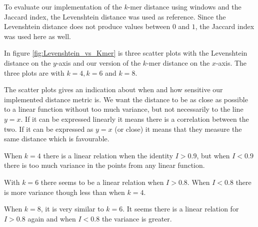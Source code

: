 To evaluate our implementation of the $k$-mer distance using windows and the
Jaccard index, the Levenshtein distance was used as reference. Since the
Levenshtein distance does not produce values between $0$ and $1$, the Jaccard
index was used here as well.

In figure \ref{fig:Levenshtein_vs_Kmer} is three scatter plots with the
Levenshtein distance on the $y$-axis and our version of the $k$-mer distance on
the $x$-axis. The three plots are with $k=4, k=6$ and $k=8$.

The scatter plots gives an indication about when and how sensitive our
implemented distance metric is. We want the distance to be as close as possible
to a linear function without too much variance, but not necessarily to the line
$y=x$. If it can be expressed linearly it means there is a correlation between
the two. If it can be expressed as $y=x$ (or close) it means that they measure
the same distance which is favourable.

When $k=4$ there is a linear relation when the identity $I>0.9$, but when
$I<0.9$ there is too much variance in the points from any linear function.

With $k=6$ there seems to be a linear relation when $I>0.8$. When $I<0.8$ there
is more variance though less than when $k=4$.

When $k=8$, it is very similar to $k=6$. It seems there is a linear relation
for $I>0.8$ again and when $I<0.8$ the variance is greater.

